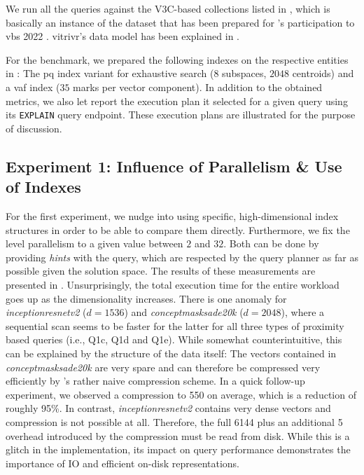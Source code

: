 We run all the queries against the V3C-based collections listed in , which is basically an instance of the dataset that has been prepared for \vitrivr{}'s \cite{Rossetto:2016Vitrivr,Gasser:2019Multimodal} participation to \acrshort{vbs} 2022 \cite{Heller:2022Multi}. vitrivr's data model has been explained in . 

For the benchmark, we prepared the following indexes on the respective entities in \cottontail{}: The \acrshort{pq} index variant for exhaustive search ($8$ subspaces, $2048$ centroids) and a \acrshort{vaf} index ($35$ marks per vector component). In addition to the obtained metrics, we also let \cottontail{} report the execution plan it selected for a given query using its \texttt{EXPLAIN} query endpoint. These execution plans are illustrated for the purpose of discussion.

\subsection{Experiment 1: Influence of Parallelism \& Use of Indexes}
For the first experiment, we nudge \cottontail{} into using specific, high-dimensional index structures in order to be able to compare them directly. Furthermore, we fix the level parallelism to a given value between $2$ and $32$. Both can be done by providing \emph{hints} with the query, which are respected by the query planner as far as possible given the solution space. The results of these measurements are presented in . Unsurprisingly, the total execution time for the entire workload goes up as the dimensionality increases. There is one anomaly for \emph{inceptionresnetv2} ($d = 1536$) and \emph{conceptmasksade20k} ($d = 2048$), where a sequential scan seems to be faster for the latter for all three types of proximity based queries (i.e., Q1c, Q1d and Q1e). While somewhat counterintuitive, this can be explained by the structure of the data itself: The vectors contained in \emph{conceptmasksade20k} are very spare and can therefore be compressed very efficiently by \cottontail{}'s rather naive compression scheme. In a quick follow-up experiment, we observed a compression to \SI{550}{\byte} on average, which is a reduction of roughly 95\%. In contrast, \emph{inceptionresnetv2} contains very dense vectors and compression is not possible at all. Therefore, the full \SI{6144}{\byte} plus an additional \SI{5}{\byte} overhead introduced by the compression must be read from disk. While this is a glitch in the implementation, its impact on query performance demonstrates the importance of IO and efficient on-disk representations.

